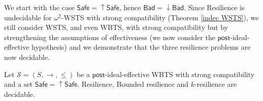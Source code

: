 \documentclass[runningheads]{llncs}
\newcommand{\alain}[1]{\todo[inline,color=red!20]{{\bf AF:} #1}}
\newcommand{\post}{\textsf{post}}
\newcommand{\Bad}{\textsf{Bad}}
\newcommand{\Safe}{\textsf{Safe}}
\begin{document}
We start with the case $\Safe=\mathop{\uparrow} \Safe$, hence $\Bad=\mathop{\downarrow} \Bad$.
Since Resilience is undecidable for  $\omega^2$-WSTS with strong compatibility (Theorem \ref{indec WSTS}), we still consider WSTS, and even WBTS, with strong compatibility but by strengthening the assumptions of effectiveness (we now consider the $\post$-ideal-effective hypothesis) and we demonstrate that the three resilience problems are now decidable.




%
\begin{theorem}\label{down-up}
Let $\mathscr{S}=(S,\rightarrow, \leq)$ be a $\post$-ideal-effective WBTS with strong compatibility and a set $\Safe = \mathop{\uparrow} \Safe$.
{\sc Resilience}, {\sc Bounded resilience} 
and {\sc $k$-resilience} are decidable.
\end{theorem}

\end{document}

